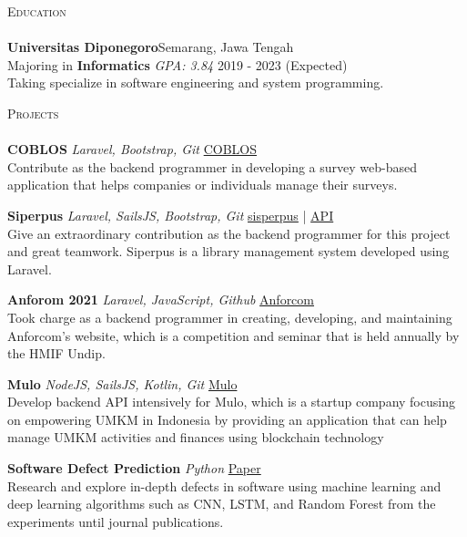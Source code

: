 \documentclass[a4paper]{article}
\newcommand{\lineunder} {
    \vspace*{-8pt} \\
    \hspace*{-18pt} \hrulefill \\
}
\newcommand{\header} [1] {
    {\hspace*{-18pt}\vspace*{6pt} \textsc{#1}}
    \vspace*{-6pt} \lineunder
}
\begin{document}
\header{Education}
\textbf{Universitas Diponegoro}\hfill Semarang, Jawa Tengah\\
Majoring in \textbf{Informatics} \textit{GPA: 3.84} \hfill 2019 - 2023 (Expected)\\
Taking specialize in software engineering and system programming.
\vspace{2mm}

\header{Projects}
{\textbf{COBLOS}} {\sl Laravel, Bootstrap, Git} \hfill \href{https://coblos.herokuapp.com/}{COBLOS}\\
Contribute as the backend programmer in developing a survey web-based application that helps companies or individuals manage their surveys.\\
\vspace*{2mm}

{\textbf{Siperpus}} {\sl Laravel, SailsJS, Bootstrap, Git} \hfill \href{http://sisperpus.herokuapp.com/}{sisperpus} | \href{https://pbp-siperpus.herokuapp.com/}{API}\\
Give an extraordinary contribution as the backend programmer for this project and great teamwork. Siperpus is a library management system developed using Laravel. \\
\vspace*{2mm}

{\textbf{Anforom 2021}} {\sl Laravel, JavaScript, Github} \hfill \href{https://anforcom.com}{Anforcom}\\
Took charge as a backend programmer in creating, developing, and maintaining Anforcom's website, which is a competition and seminar that is held annually by the HMIF Undip.\\
\vspace*{2mm}

{\textbf{Mulo}} {\sl NodeJS, SailsJS, Kotlin, Git} \hfill \href{https://muloapp.id/}{Mulo}\\
Develop backend API intensively for Mulo, which is a startup company focusing on empowering UMKM in Indonesia by providing an application that can help manage UMKM activities and finances using blockchain technology\\
\vspace*{2mm}

{\textbf{Software Defect Prediction}} {\sl Python} \hfill \href{https://github.com/mhnaufal/Software-Defect-Finale/blob/main/reports/PAPER-Software%20Defect%20Prediction.pdf}{Paper}\\
Research and explore in-depth defects in software using machine learning and deep learning algorithms such as CNN, LSTM, and Random Forest from the experiments until journal publications.\\
\vspace*{2mm}
\end{document}
